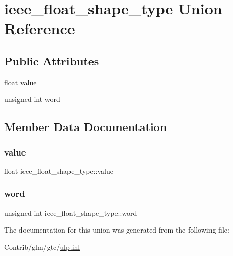 \hypertarget{unionieee__float__shape__type}{}\section{ieee\+\_\+float\+\_\+shape\+\_\+type Union Reference}
\label{unionieee__float__shape__type}
\subsection*{Public Attributes}
\begin{DoxyCompactItemize}
\item 
float \mbox{\hyperlink{unionieee__float__shape__type_aa0c47451f1b974421cbb9e2833ddb68e}{value}}
\item 
unsigned int \mbox{\hyperlink{unionieee__float__shape__type_a49230c21acd672d044f38b1abcbd6071}{word}}
\end{DoxyCompactItemize}


\subsection{Member Data Documentation}
\mbox{\label{unionieee__float__shape__type_aa0c47451f1b974421cbb9e2833ddb68e}} 
\subsubsection{\texorpdfstring{value}{value}}
{\footnotesize\ttfamily float ieee\+\_\+float\+\_\+shape\+\_\+type\+::value}

\mbox{\label{unionieee__float__shape__type_a49230c21acd672d044f38b1abcbd6071}} 
\subsubsection{\texorpdfstring{word}{word}}
{\footnotesize\ttfamily unsigned int ieee\+\_\+float\+\_\+shape\+\_\+type\+::word}



The documentation for this union was generated from the following file\+:\begin{DoxyCompactItemize}
\item 
Contrib/glm/gtc/\mbox{\hyperlink{ulp_8inl}{ulp.\+inl}}\end{DoxyCompactItemize}
